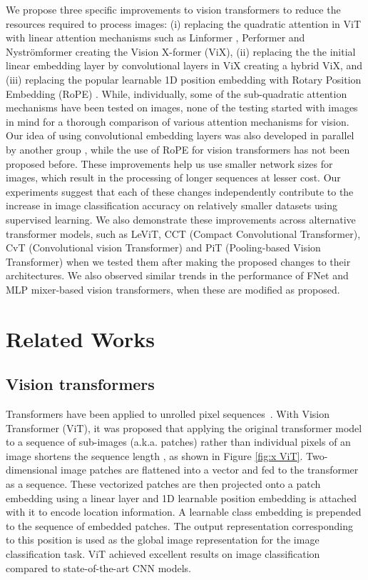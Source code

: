 \documentclass{article}
\begin{document}
We propose three specific improvements to vision transformers to reduce the resources required to process images: (i) replacing the quadratic attention in ViT with linear attention mechanisms such as Linformer \cite{wang2020linformer}, Performer \cite{choromanski2021rethinking} and Nyströmformer \cite{xiong2021nystromformer} creating the Vision X-former (ViX), (ii) replacing the the initial linear embedding layer by convolutional layers in ViX creating a hybrid ViX, and (iii) replacing the popular learnable 1D position embedding with Rotary Position Embedding (RoPE) \cite{su2021roformer}. While, individually, some of the sub-quadratic attention mechanisms have been tested on images, none of the testing started with images in mind for a thorough comparison of various attention mechanisms for vision. Our idea of using convolutional embedding layers was also developed in parallel by another group \cite{xiao2021early}, while the use of RoPE for vision transformers has not been proposed before. These improvements help us use smaller network sizes for images, which result in the processing of longer sequences at lesser cost. Our experiments suggest that each of these changes independently contribute to the increase in image classification accuracy on relatively smaller datasets using supervised learning. We also demonstrate these improvements across alternative transformer models, such as LeViT, CCT (Compact Convolutional Transformer), CvT  (Convolutional vision Transformer) and PiT (Pooling-based Vision Transformer) when we tested them after making the proposed changes to their architectures. We also observed similar trends in the performance of FNet and MLP mixer-based vision transformers, when these are modified as proposed.

\section{Related Works}

\subsection{Vision transformers}

Transformers have been applied to unrolled pixel sequences~\cite{parmar2018image}. With Vision Transformer (ViT), it was proposed that applying the original transformer model to a sequence of sub-images (a.k.a. patches) rather than individual pixels  of an image shortens the sequence length \cite{dosovitskiy2021image}, as shown in Figure \ref{fig:x ViT}. Two-dimensional image patches are flattened into a vector and fed to the transformer as a sequence. These vectorized patches are then projected onto a patch embedding using a linear layer and 1D learnable position embedding is attached with it to encode location information. A learnable class embedding is prepended to the sequence of embedded patches. The output representation corresponding to this position is used as the global image representation for the image classification task. ViT achieved excellent results on image classification compared to state-of-the-art CNN models.  
\end{document}
